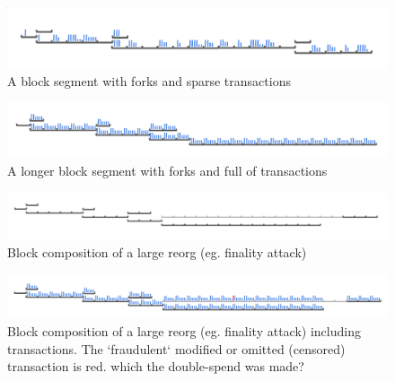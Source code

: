 \documentclass[11pt]{article}
\theoremstyle{plain}
\begin{document}
\begin{figure}[tph]
    \centering
    \includegraphics[width=1.0\textwidth]{imgs/vis_blocksegment_forking_txs_sparse.png}
    \caption{A block segment with forks and sparse transactions}
    \label{fig:blocksegment_forks_txs_sparse}
\end{figure}

\begin{figure}[tph]
    \centering
    \includegraphics[width=1.0\textwidth]{imgs/vis_blocksegment_forking_txs_full.png}
    \caption{A longer block segment with forks and full of transactions}
    \label{fig:blocksegment_forks_txs_full}
\end{figure}


\begin{figure}[tph]
    \centering
    \includegraphics[width=1.0\textwidth]{imgs/vis_blocksegment_forking_reorg.png}
    \caption{Block composition of a large reorg (eg. finality attack)}
    \label{fig:blocksegment_forks_reorg}
\end{figure}

\begin{figure}[tph]
    \centering
    \includegraphics[width=1.0\textwidth]{imgs/vis_blocksegment_forking_reorg_txs.png}
    \caption{Block composition of a large reorg (eg. finality attack) including
    transactions.
    The `fraudulent` modified or omitted (censored) transaction is red.
    which the double-spend was made?
    }
    \label{fig:blocksegment_forks_reorg_txs}
\end{figure}
\end{document}
